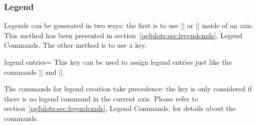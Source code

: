 \subsubsection{Legend}
\label{pgfplots:sec:legendopts}
Legends can be generated in two ways: the first is to use |\addlegendentry| or |\legend| inside of an axis. This method has been presented in section~\ref{pgfplots:sec:legendcmds}, Legend Commands. The other method is to use a key.

\begin{pgfplotskey}{legend entries=}
	This key can be used to assign legend entries just like the commands |\addlegendentry| and |\legend|.
\begin{codeexample}[]
\end{codeexample}

	The commands for legend creation take precedence: the key is only considered if there is no legend command in the current axis. Please refer to section~\ref{pgfplots:sec:legendcmds}, Legend Commands, for details about the commands.	
\begin{codeexample}[]
\end{codeexample}
\end{pgfplotskey}

